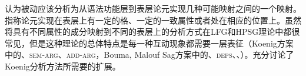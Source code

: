 \begin{exe}
\begin{xlist}[iv.]
\begin{exe}
\begin{xlist}[iv.]
\citet[Chapter~6.3]{CJ2005a}认为被动应该分析为从语法功能层到表层论元实现几种可能映射之间的一个映射。指称论元实现在表层上有一定的格、一定的一致属性或者处在相应的位置上。虽然将具有不同属性的成分映射到不同的表层上的分析方式在LFG和HPSG理论\citep*{Koenig99a,BMS2001a}中都很常见，但是这种理论的总体特点是每一种互动现象都需要一层表征（Koenig方案中的\argstc、\textsc{sem-arg}、\textsc{add-arg}，Bouma, Malouf \biband Sag方案中的\argstc、\textsc{deps}、\sprc、\compsc）。充分讨论了Koenig分析方法所需要的扩展。


\end{xlist}
\end{exe}
\end{xlist}
\end{exe}

